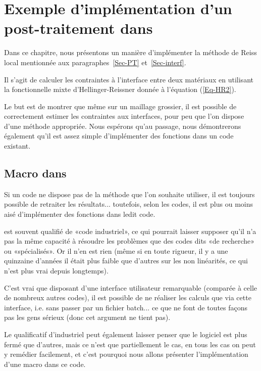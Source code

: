\section{Exemple d'implémentation d'un post-traitement dans \ansys}

Dans ce chapitre, nous présentons un manière d'implémenter la méthode de Reiss local mentionnée aux
paragraphes~\ref{Sec-PT} et~\ref{Sec-interf}.

Il s'agit de calculer les contraintes à l'interface entre deux matériaux en utilisant la fonctionnelle mixte d'Hellinger-Reissner
donnée à l'équation (\ref{Eq-HR2}).

\medskip
Le but est de montrer que même sur un maillage grossier, il est possible de correctement estimer les contraintes
aux interfaces, pour peu que l'on dispose d'une méthode appropriée. Nous espérons qu'au passage, nous
démontrerons également qu'il est assez simple d'implémenter des fonctions dans un code existant.





\medskip
\subsection{Macro dans \ansys}

Si un code ne dispose pas de la méthode que l'on souhaite utiliser, il est toujours possible de retraiter les
résultats... toutefois, selon les codes, il est plus ou moins aisé d'implémenter des fonctions dans ledit code.

\medskip
\ansys est souvent qualifié de «code industriel», ce qui pourrait laisser supposer qu'il n'a pas la même capacité
à résoudre les problèmes que des codes dits «de recherche» ou «spécialisés».
Or il n'en est rien (même si en toute rigueur, il y a une quinzaine d'années il était plus faible que d'autres sur
les non linéarités, ce qui n'est plus vrai depuis longtemps).

C'est vrai que disposant d'une interface utilisateur remarquable (comparée à celle de nombreux autres codes),
il est possible de ne réaliser les calculs que via cette interface, i.e. sans passer par un fichier batch... ce que ne
font de toutes façons pas les gens sérieux (donc cet argument ne tient pas).

Le qualificatif d'industriel peut également laisser penser que le logiciel est plus fermé que d'autres, mais ce
n'est que partiellement le cas, en tous les cas on peut y remédier facilement, et c'est pourquoi nous allons
présenter l'implémentation d'une macro dans ce code.


